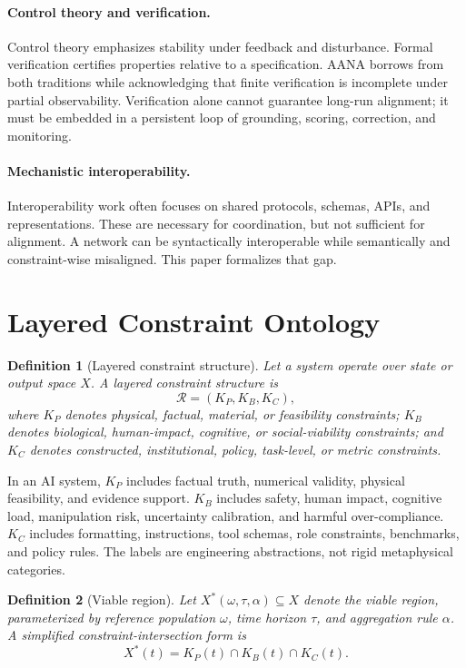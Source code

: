 \documentclass[11pt]{article}
\newtheorem{definition}{Definition}
\newcommand{\KP}{K_P}
\newcommand{\KB}{K_B}
\newcommand{\KC}{K_C}
\newcommand{\Xstar}{X^*}
\newcommand{\Rcal}{\mathcal{R}}
\begin{document}
\paragraph{Control theory and verification.} Control theory emphasizes stability under feedback and disturbance. Formal verification certifies properties relative to a specification. AANA borrows from both traditions while acknowledging that finite verification is incomplete under partial observability. Verification alone cannot guarantee long-run alignment; it must be embedded in a persistent loop of grounding, scoring, correction, and monitoring.

\paragraph{Mechanistic interoperability.} Interoperability work often focuses on shared protocols, schemas, APIs, and representations. These are necessary for coordination, but not sufficient for alignment. A network can be syntactically interoperable while semantically and constraint-wise misaligned. This paper formalizes that gap.

\section{Layered Constraint Ontology}

\begin{definition}[Layered constraint structure]
Let a system operate over state or output space $X$. A layered constraint structure is
\begin{equation}
\Rcal=(\KP,\KB,\KC),
\end{equation}
where $\KP$ denotes physical, factual, material, or feasibility constraints; $\KB$ denotes biological, human-impact, cognitive, or social-viability constraints; and $\KC$ denotes constructed, institutional, policy, task-level, or metric constraints.
\end{definition}

In an AI system, $\KP$ includes factual truth, numerical validity, physical feasibility, and evidence support. $\KB$ includes safety, human impact, cognitive load, manipulation risk, uncertainty calibration, and harmful over-compliance. $\KC$ includes formatting, instructions, tool schemas, role constraints, benchmarks, and policy rules. The labels are engineering abstractions, not rigid metaphysical categories.

\begin{definition}[Viable region]
Let $\Xstar(\omega,\tau,\alpha)\subseteq X$ denote the viable region, parameterized by reference population $\omega$, time horizon $\tau$, and aggregation rule $\alpha$. A simplified constraint-intersection form is
\begin{equation}
\Xstar(t)=\KP(t)\cap\KB(t)\cap\KC(t).
\end{equation}
\end{definition}
\end{document}
